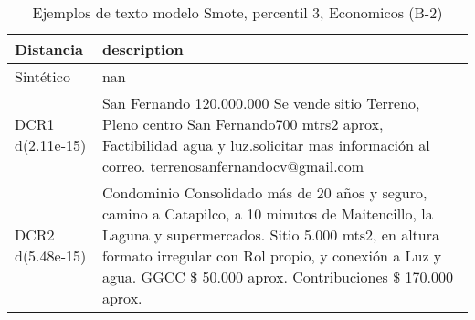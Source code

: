 \begin{table}[H]
\centering
\fontsize{10}{14}\selectfont
\caption{Ejemplos de texto modelo Smote, percentil 3, Economicos (B-2)}
\label{table-example-economicos-b-2-smote-enc-3p-text}
\begin{tabular}{|l|m{35em}|}
\hline
\rowcolor[gray]{0.8}
Distancia & description \\
\hline Sintético & nan \\
\hline DCR1 d(2.11e-15) & San Fernando 120.000.000 Se vende sitio Terreno, Pleno centro San Fernando700 mtrs2 aprox, Factibilidad agua y luz.solicitar mas informaci\'on al correo.  terrenosanfernandocv@gmail.com \\
\hline DCR2 d(5.48e-15) & Condominio Consolidado m\'as de 20 a\~nos y seguro, camino a Catapilco, a 10 minutos de Maitencillo, la Laguna y supermercados.
Sitio 5.000 mts2, en altura formato irregular con Rol propio, y conexi\'on a Luz y agua.
GGCC \$ 50.000 aprox.
Contribuciones \$ 170.000 aprox. \\
\hline
\end{tabular}
\end{table}
